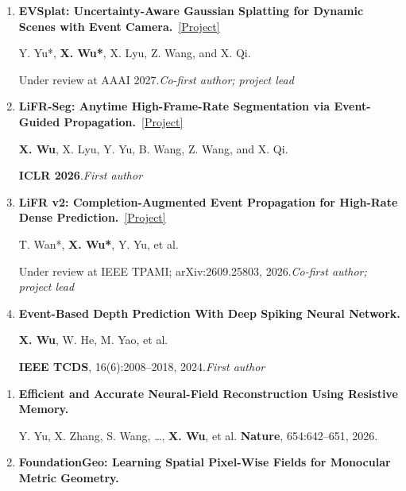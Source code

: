 \documentclass[a4paper]{article}
\newcommand{\pubgroup}[1]{%
  \par\vspace{2.0pt}{\color{cvblue}\fontsize{9.4}{10.4}\selectfont\bfseries #1}\par
}
\begin{document}
{\begin{enumerate}[leftmargin=1.6em,labelsep=0.38em,itemsep=0.4pt,topsep=1.3pt,parsep=0pt,partopsep=0pt]
\textbf{X. Wu}, Y. Yu, X. Lyu, et al.\par
\textbf{NeurIPS 2025} \textcolor{cvred}{\textbf{\textperiodcentered\ Spotlight}}.\hfill\textcolor{cvblue}{\textit{First author}}
\item \textbf{EVSplat: Uncertainty-Aware Gaussian Splatting for Dynamic Scenes with Event Camera.}~\href{https://candy-crusher.github.io/xiaoshanwu.github.io/projects/evsplat/}{\textcolor{cvblue}{[Project]}}\par
Y. Yu*, \textbf{X. Wu*\textdagger}, X. Lyu, Z. Wang, and X. Qi.\par
Under review at AAAI 2027.\hfill\textcolor{cvblue}{\textit{Co-first author; project lead}}
\item \textbf{LiFR-Seg: Anytime High-Frame-Rate Segmentation via Event-Guided Propagation.}~\href{https://candy-crusher.github.io/xiaoshanwu.github.io/projects/lifr-seg/}{\textcolor{cvblue}{[Project]}}\par
\textbf{X. Wu}, X. Lyu, Y. Yu, B. Wang, Z. Wang, and X. Qi.\par
\textbf{ICLR 2026}.\hfill\textcolor{cvblue}{\textit{First author}}
\item \textbf{LiFR v2: Completion-Augmented Event Propagation for High-Rate Dense Prediction.}~\href{https://candy-crusher.github.io/xiaoshanwu.github.io/projects/lifr-v2/}{\textcolor{cvblue}{[Project]}}\par
T. Wan*, \textbf{X. Wu*\textdagger}, Y. Yu, et al.\par
Under review at IEEE TPAMI; arXiv:2609.25803, 2026.\hfill\textcolor{cvblue}{\textit{Co-first author; project lead}}
\item \textbf{Event-Based Depth Prediction With Deep Spiking Neural Network.}\par
\textbf{X. Wu}, W. He, M. Yao, et al.\par
\textbf{IEEE TCDS}, 16(6):2008--2018, 2024.\hfill\textcolor{cvblue}{\textit{First author}}
\end{enumerate}
\pubgroup{Collaborative Work}
\begin{enumerate}[resume,leftmargin=1.6em,labelsep=0.38em,itemsep=0.4pt,topsep=1.3pt,parsep=0pt,partopsep=0pt]
\item \textbf{Efficient and Accurate Neural-Field Reconstruction Using Resistive Memory.}\par
Y. Yu, X. Zhang, S. Wang, \ldots, \textbf{X. Wu}, et al. \hfill \textbf{Nature}, 654:642--651, 2026.
\item \textbf{FoundationGeo: Learning Spatial Pixel-Wise Fields for Monocular Metric Geometry.}\par

\end{enumerate}}
\end{document}
